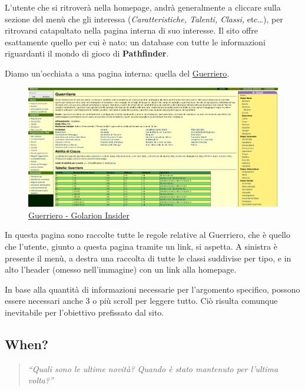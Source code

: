 L'utente che si ritroverà nella homepage, andrà generalmente a cliccare sulla sezione del menù che gli interessa (\emph{Caratteristiche, %
Talenti, Classi,} etc\dots), per ritrovarsi catapultato nella pagina interna di suo interesse. Il sito offre esattamente quello
per cui è nato: un database con tutte le informazioni riguardanti il mondo di gioco di \textbf{Pathfinder}.

\newpage
Diamo un'occhiata a una pagina interna: quella del \href{http://golarion.altervista.org/wiki/Guerriero}{Guerriero}.

\begin{figure}[hbt]
    \centering
    \includegraphics[width=\textwidth]{img/guerriero.png}
    \caption{\href{http://golarion.altervista.org/wiki/Guerriero}{Guerriero - Golarion Insider}}
    \label{fig:guerriero}
\end{figure}

In questa pagina sono raccolte tutte le regole relative al Guerriero, che è quello che l'utente, giunto a questa pagina tramite un link, si aspetta.
A sinistra è presente il menù, a destra una raccolta di tutte le classi suddivise per tipo, e in alto l'header (omesso nell'immagine) 
con un link alla homepage.\par
In base alla quantità di informazioni necessarie per l'argomento specifico, possono essere necessari anche 3 o più
scroll per leggere tutto. Ciò risulta comunque inevitabile per l'obiettivo prefissato dal sito.

\clearpage

\subsection{When?}
\begin{quote}
    \emph{``Quali sono le ultime novità? Quando è stato mantenuto per l'ultima volta?''}
\end{quote}

